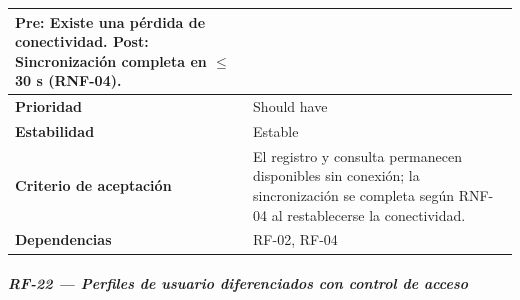 \documentclass[
]{article}
\begin{document}
{\begin{longtable}[]{|
  >{\raggedright\arraybackslash}p{}|
  >{\raggedright\arraybackslash}p{}|}
\begin{minipage}[t]{\linewidth}
Pre: Existe una pérdida de conectividad. Post: Sincronización completa en $\leq$30 s (RNF-04).
\end{minipage} \\
\hline
\textbf{Prioridad} & \begin{minipage}[t]{\linewidth}\raggedright
Should have
\end{minipage} \\
\hline
\textbf{Estabilidad} & \begin{minipage}[t]{\linewidth}\raggedright
Estable
\end{minipage} \\
\hline
\textbf{Criterio de aceptación} &
\begin{minipage}[t]{\linewidth}\raggedright
El registro y consulta permanecen disponibles sin conexión; la sincronización se completa según RNF-04 al restablecerse la conectividad.
\end{minipage} \\
\hline
\textbf{Dependencias} & \begin{minipage}[t]{\linewidth}\raggedright
RF-02, RF-04
\end{minipage} \\
\hline
\end{longtable}
}

\subparagraph{RF-22 --- Perfiles de usuario diferenciados con control de acceso}\label{rf-22-perfiles-de-usuario-diferenciados-con-co}
\end{document}
